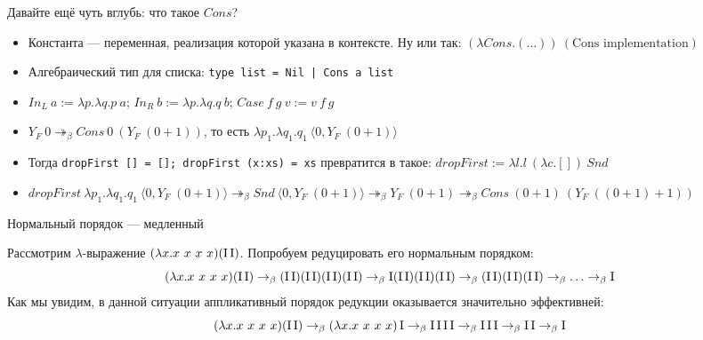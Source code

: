 \documentclass[aspectratio=169]{beamer}
\begin{document}
\begin{frame}[fragile]{Давайте ещё чуть вглубь: что такое $Cons$?}
\begin{itemize}
\item Константа --- переменная, реализация которой указана в контексте. Ну или так: $(\lambda Cons.(\dots))\ (\text{Cons implementation})$
\item Алгебраический тип для списка: \verb!type list = Nil | Cons a list!
\item $In_L\ a := \lambda p.\lambda q.p\ a$; $In_R\ b := \lambda p.\lambda q.q\ b$; $Case\ f\ g\ v := v\ f\ g$
\item $Y_F\ 0\twoheadrightarrow_\beta Cons\ 0\ (Y_F\ (0+1))$, то есть $\lambda p_1.\lambda q_1.q_1\ \langle 0,Y_F\ (0+1)\rangle$
\item Тогда \verb!dropFirst [] = []; dropFirst (x:xs) = xs! превратится в такое:
$dropFirst := \lambda l.l\ (\lambda c.[])\ Snd$
\item $dropFirst\ \lambda p_1.\lambda q_1.q_1\ \langle 0,Y_F\ (0+1)\rangle \twoheadrightarrow_\beta 
Snd\ \langle 0,Y_F\ (0+1)\rangle\twoheadrightarrow_\beta Y_F\ (0+1)\twoheadrightarrow_\beta Cons\ (0+1)\ (Y_F\ ((0+1)+1))$
\end{itemize}
\end{frame}

\begin{frame}{Нормальный порядок --- медленный}

\begin{exm}
	Рассмотрим $\lambda$-выражение $(\lambda{}x.x \ x \ x \ x) (\operatorname{\bf{\textrm{I}}} \operatorname{\bf{\textrm{I}}})$. Попробуем редуцировать его нормальным порядком:
	 \[(\lambda{}x.x \ x \ x \ x) (\operatorname{\bf{\textrm{I}}} \operatorname{\bf{\textrm{I}}}) \to_{\beta} (\operatorname{\bf{\textrm{I}}} \operatorname{\bf{\textrm{I}}})(\operatorname{\bf{\textrm{I}}} \operatorname{\bf{\textrm{I}}})(\operatorname{\bf{\textrm{I}}} \operatorname{\bf{\textrm{I}}})(\operatorname{\bf{\textrm{I}}} \operatorname{\bf{\textrm{I}}}) \to_{\beta} \operatorname{\bf{\textrm{I}}}(\operatorname{\bf{\textrm{I}}} \operatorname{\bf{\textrm{I}}})(\operatorname{\bf{\textrm{I}}} \operatorname{\bf{\textrm{I}}})(\operatorname{\bf{\textrm{I}}} \operatorname{\bf{\textrm{I}}}) \to_{\beta} (\operatorname{\bf{\textrm{I}}} \operatorname{\bf{\textrm{I}}})(\operatorname{\bf{\textrm{I}}} \operatorname{\bf{\textrm{I}}})(\operatorname{\bf{\textrm{I}}} \operatorname{\bf{\textrm{I}}}) \to_{\beta} \ldots \to_{\beta} \operatorname{\bf{\textrm{I}}}\] 
	Как мы увидим, в данной ситуации аппликативный порядок редукции оказывается значительно эффективней: 
	\[ (\lambda{}x.x \ x \ x \ x) (\operatorname{\bf{\textrm{I}}} \operatorname{\bf{\textrm{I}}}) \to_{\beta} (\lambda{}x.x \ x \ x \ x) \operatorname{\bf{\textrm{I}}} \to_{\beta} \operatorname{\bf{\textrm{I}}} \operatorname{\bf{\textrm{I}}} \operatorname{\bf{\textrm{I}}} \operatorname{\bf{\textrm{I}}}\to_{\beta} \operatorname{\bf{\textrm{I}}} \operatorname{\bf{\textrm{I}}} \operatorname{\bf{\textrm{I}}} \to_{\beta} \operatorname{\bf{\textrm{I}}} \operatorname{\bf{\textrm{I}}} \to_{\beta} \operatorname{\bf{\textrm{I}}} \]
\end{exm}
\end{frame}
\end{document}
